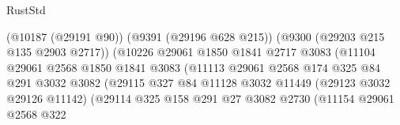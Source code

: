 \begin{lexlean}{RustStd}
\begin{coremodule}
                                                (@10187 (@29191 @90))
                                                (@9391 (@29196 @628 @215))
                                                (@9300 (@29203 @215 @135 @2903 @2717))
                                                (@10226
                                                  @29061
                                                  @1850
                                                  @1841
                                                  @2717
                                                  @3083
                                                  (@11104
                                                    @29061
                                                    @2568
                                                    @1850
                                                    @1841
                                                    @3083
                                                    (@11113
                                                      @29061
                                                      @2568
                                                      @174
                                                      @325
                                                      @84
                                                      @291
                                                      @3032
                                                      @3082
                                                      (@29115
                                                        @327
                                                        @84
                                                        @11128
                                                        @3032
                                                        @11449
                                                        (@29123 @3032 @29126 @11142)
                                                        (@29114
                                                          @325
                                                          @158
                                                          @291
                                                          @27
                                                          @3082
                                                          @2730
                                                          (@11154
                                                            @29061
                                                            @2568
                                                            @322

\end{coremodule}
\end{lexlean}

